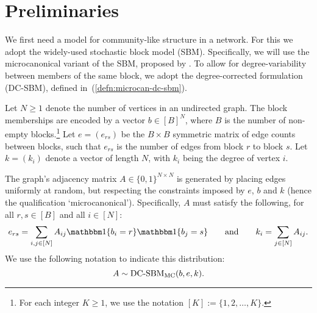 \section{Preliminaries}

We first need a model for community-like structure in a network. For this we adopt the widely-used stochastic block model (SBM).
Specifically, we will use the microcanonical variant of the SBM, proposed by \citet{Peixoto-Bayesian-Microcanonical}. To allow for degree-variability between members of the same block, we adopt the degree-corrected formulation (DC-SBM), defined in~(\ref{defn:microcan-dc-sbm}).

\begin{definition}
	\label{defn:microcan-dc-sbm}
	Let $N \geq 1$ denote the number of vertices in an undirected graph. The block memberships are encoded by a vector $b \in [B]^N$,
where $B$ is the number of non-empty blocks.\footnote{For each integer $K\geq 1$, we use the notation $[K]:=\{1,2,\ldots,K\}$.}
	Let $e=(e_{rs})$ be the $B \times B$ symmetric matrix of edge counts 
between blocks, such that $e_{rs}$ is the number of edges from block $r$ to 
block $s$. 
	Let $k =(k_i)$ denote a vector of length $N$, with $k_i$ being the degree of vertex $i$.

The graph's adjacency matrix $A \in \{0,1\}^{N \times N}$ is generated 
by placing edges uniformly at random, but respecting the constraints 
imposed by $e$, $b$ and $k$ (hence the qualification `microcanonical').
Specifically, $A$ must satisfy the following, for all $r,s\in[B]$
and all $i\in[N]$:
	\begin{equation}
		e_{rs} = \sum_{i, j \in [N]} A_{ij} 
	\one \{b_i = r\} \one \{b_j = s\} 
		\qquad 
		\textrm{and} \qquad
		k_i = \sum_{j \in [N]} A_{ij}.
		\label{eqn:sbm-constraints}
	\end{equation}
We use the following notation to indicate this distribution:
\begin{equation}
		A \sim \mbox{\rm DC-SBM}_{\rm MC} (b, e, k).
	\end{equation}
\end{definition}

